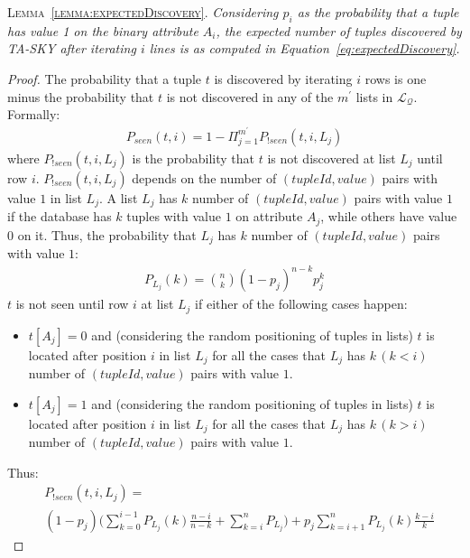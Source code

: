 \textsc{Lemma~\ref{lemma:expectedDiscovery}.} {\em
Considering $p_i$ as the probability that a tuple has value 1 on the binary attribute $A_i$, the expected number of tuples discovered by TA-SKY after iterating $i$ lines is as computed in Equation~\ref{eq:expectedDiscovery}.
}
\begin{proof}
The probability that a tuple $t$ is discovered by iterating $i$ rows is one minus the probability that $t$ is not discovered in any of the $m^\prime$ lists in $\mathcal{L_Q}$. Formally:
\begin{align}
P_{seen}(t,i) = 1 - \Pi_{j=1}^{m^\prime} P_{!seen}(t,i,L_j)
\end{align}
where $P_{!seen}(t,i,L_j)$ is the probability that $t$ is not discovered at list $L_j$ until row $i$.
$P_{!seen}(t,i,L_j)$ depends on the number of $(tupleId, value)$ pairs with value $1$ in list $L_j$. A list $L_j$ has $k$ number of $(tupleId, value)$ pairs with value $1$ if the database has $k$ tuples with value $1$ on attribute $A_j$, while others have value $0$ on it. Thus, the probability that $L_j$ has $k$ number of $(tupleId, value)$ pairs with value $1$:
\begin{align}
P_{L_j}(k) = {n\choose k}(1-p_j)^{n-k}p_j^k
\end{align}
$t$ is not seen until row $i$ at list $L_j$ if either of the following cases happen:
\begin{itemize}
\item $t[A_j] = 0$ and (considering the random positioning of tuples in lists) $t$ is located after position $i$ in list $L_j$ for all the cases that $L_j$ has $k \, (k < i)$ number of $(tupleId, value)$ pairs with value $1$. %
\item $t[A_j] = 1$ and (considering the random positioning of tuples in lists) $t$ is located after position $i$ in list $L_j$ for all the cases that $L_j$ has $k \, (k > i)$ number of $(tupleId, value)$ pairs with value $1$.
\end{itemize}
Thus:
\begin{align}
\nonumber
&P_{!seen}(t,i,L_j) = \\ 
&(1 - p_j) \Big(\sum_{k=0}^{i-1}P_{L_j}(k)\frac{n-i}{n-k} + \sum_{k=i}^{n}P_{L_j} \Big) + p_j\sum_{k=i+1}^n P_{L_j}(k) \frac{k-i}{k}

\end{align}
\end{proof}
